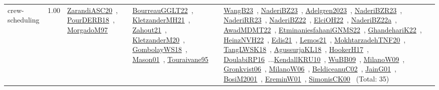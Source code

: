 {\begin{longtable}{p{3cm}r>{\raggedright\arraybackslash}p{6cm}>{\raggedright\arraybackslash}p{6cm}>{\raggedright\arraybackslash}p{8cm}}
\index{crew-scheduling}\index{ApplicationAreas!crew-scheduling}crew-scheduling &  1.00 & \href{../works/ZarandiASC20.pdf}{ZarandiASC20}~\cite{ZarandiASC20}, \href{../works/PourDERB18.pdf}{PourDERB18}~\cite{PourDERB18}, \href{../works/MorgadoM97.pdf}{MorgadoM97}~\cite{MorgadoM97} & \href{../works/BourreauGGLT22.pdf}{BourreauGGLT22}~\cite{BourreauGGLT22}, \href{../works/KletzanderMH21.pdf}{KletzanderMH21}~\cite{KletzanderMH21}, \href{../works/Zahout21.pdf}{Zahout21}~\cite{Zahout21}, \href{../works/KletzanderM20.pdf}{KletzanderM20}~\cite{KletzanderM20}, \href{../works/GombolayWS18.pdf}{GombolayWS18}~\cite{GombolayWS18}, \href{../works/Mason01.pdf}{Mason01}~\cite{Mason01}, \href{../works/Touraivane95.pdf}{Touraivane95}~\cite{Touraivane95} & \href{../works/WangB23.pdf}{WangB23}~\cite{WangB23}, \href{../works/NaderiBZ23.pdf}{NaderiBZ23}~\cite{NaderiBZ23}, \href{../works/Adelgren2023.pdf}{Adelgren2023}~\cite{Adelgren2023}, \href{../works/NaderiBZR23.pdf}{NaderiBZR23}~\cite{NaderiBZR23}, \href{../works/NaderiRR23.pdf}{NaderiRR23}~\cite{NaderiRR23}, \href{../works/NaderiBZ22.pdf}{NaderiBZ22}~\cite{NaderiBZ22}, \href{../works/ElciOH22.pdf}{ElciOH22}~\cite{ElciOH22}, \href{../works/NaderiBZ22a.pdf}{NaderiBZ22a}~\cite{NaderiBZ22a}, \href{../works/AwadMDMT22.pdf}{AwadMDMT22}~\cite{AwadMDMT22}, \href{../works/EtminaniesfahaniGNMS22.pdf}{EtminaniesfahaniGNMS22}~\cite{EtminaniesfahaniGNMS22}, \href{../works/GhandehariK22.pdf}{GhandehariK22}~\cite{GhandehariK22}, \href{../works/HeinzNVH22.pdf}{HeinzNVH22}~\cite{HeinzNVH22}, \href{../works/Edis21.pdf}{Edis21}~\cite{Edis21}, \href{../works/Lemos21.pdf}{Lemos21}~\cite{Lemos21}, \href{../works/MokhtarzadehTNF20.pdf}{MokhtarzadehTNF20}~\cite{MokhtarzadehTNF20}, \href{../works/TangLWSK18.pdf}{TangLWSK18}~\cite{TangLWSK18}, \href{../works/AgussurjaKL18.pdf}{AgussurjaKL18}~\cite{AgussurjaKL18}, \href{../works/HookerH17.pdf}{HookerH17}~\cite{HookerH17}, \href{../works/DoulabiRP16.pdf}{DoulabiRP16}~\cite{DoulabiRP16}...\href{../works/KendallKRU10.pdf}{KendallKRU10}~\cite{KendallKRU10}, \href{../works/WuBB09.pdf}{WuBB09}~\cite{WuBB09}, \href{../works/MilanoW09.pdf}{MilanoW09}~\cite{MilanoW09}, \href{../works/Gronkvist06.pdf}{Gronkvist06}~\cite{Gronkvist06}, \href{../works/MilanoW06.pdf}{MilanoW06}~\cite{MilanoW06}, \href{../works/BeldiceanuC02.pdf}{BeldiceanuC02}~\cite{BeldiceanuC02}, \href{../works/JainG01.pdf}{JainG01}~\cite{JainG01}, \href{../works/BosiM2001.pdf}{BosiM2001}~\cite{BosiM2001}, \href{../works/EreminW01.pdf}{EreminW01}~\cite{EreminW01}, \href{../works/SimonisCK00.pdf}{SimonisCK00}~\cite{SimonisCK00} (Total: 35)\\

\end{longtable}}
